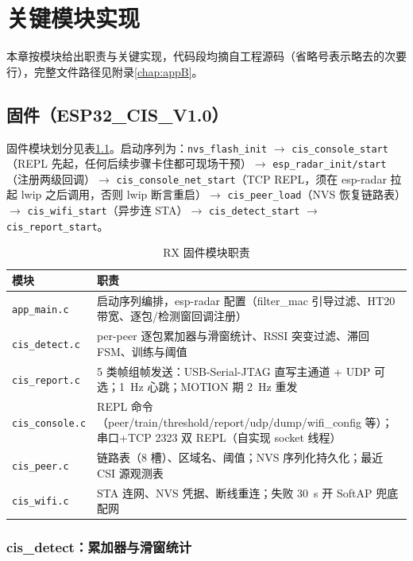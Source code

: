 \chapter{关键模块实现}\label{sec:fwimpl}

本章按模块给出职责与关键实现，代码段均摘自工程源码（省略号表示略去的次要行），完整文件路径见附录\ref{chap:appB}。

\section{固件（ESP32\_CIS\_V1.0）}

固件模块划分见表\ref{tab:fwmod}。启动序列为：\texttt{nvs\_flash\_init} $\to$ \texttt{cis\_console\_start}（REPL 先起，任何后续步骤卡住都可现场干预）$\to$ \texttt{esp\_radar\_init/start}（注册两级回调）$\to$ \texttt{cis\_console\_net\_start}（TCP REPL，须在 esp-radar 拉起 lwip 之后调用，否则 lwip 断言重启）$\to$ \texttt{cis\_peer\_load}（NVS 恢复链路表）$\to$ \texttt{cis\_wifi\_start}（异步连 STA）$\to$ \texttt{cis\_detect\_start} $\to$ \texttt{cis\_report\_start}。

\begin{table}[htbp]
  \centering
  \caption{RX 固件模块职责}
  \label{tab:fwmod}
  \begin{tabular}{lp{9.6cm}}
    \toprule
    \textbf{模块} & \textbf{职责} \\
    \midrule
    \texttt{app\_main.c} & 启动序列编排，esp-radar 配置（filter\_mac 引导过滤、HT20 带宽、逐包/检测窗回调注册） \\
    \texttt{cis\_detect.c} & per-peer 逐包累加器与滑窗统计、RSSI 突变过滤、滞回 FSM、训练与阈值 \\
    \texttt{cis\_report.c} & 5 类帧组帧发送：USB-Serial-JTAG 直写主通道 + UDP 可选；1~Hz 心跳；MOTION 期 2~Hz 重发 \\
    \texttt{cis\_console.c} & REPL 命令（peer/train/threshold/report/udp/dump/wifi\_config 等）；串口+TCP 2323 双 REPL（自实现 socket 线程） \\
    \texttt{cis\_peer.c} & 链路表（8 槽）、区域名、阈值；NVS 序列化持久化；最近 CSI 源观测表 \\
    \texttt{cis\_wifi.c} & STA 连网、NVS 凭据、断线重连；失败 30~s 开 SoftAP 兜底配网 \\
    \bottomrule
  \end{tabular}
\end{table}

\subsection{cis\_detect：累加器与滑窗统计}

